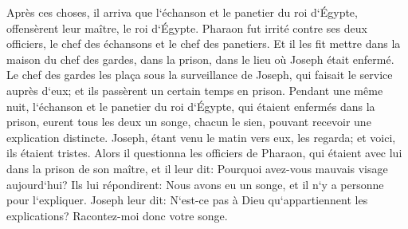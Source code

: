 \verse Après ces choses, il arriva que l`échanson et le panetier du roi d`Égypte, offensèrent leur maître, le roi d`Égypte. 
\verse Pharaon fut irrité contre ses deux officiers, le chef des échansons et le chef des panetiers. 
\verse Et il les fit mettre dans la maison du chef des gardes, dans la prison, dans le lieu où Joseph était enfermé. 
\verse Le chef des gardes les plaça sous la surveillance de Joseph, qui faisait le service auprès d`eux; et ils passèrent un certain temps en prison. 
\verse Pendant une même nuit, l`échanson et le panetier du roi d`Égypte, qui étaient enfermés dans la prison, eurent tous les deux un songe, chacun le sien, pouvant recevoir une explication distincte. 
\verse Joseph, étant venu le matin vers eux, les regarda; et voici, ils étaient tristes. 
\verse Alors il questionna les officiers de Pharaon, qui étaient avec lui dans la prison de son maître, et il leur dit: Pourquoi avez-vous mauvais visage aujourd`hui? 
\verse Ils lui répondirent: Nous avons eu un songe, et il n`y a personne pour l`expliquer. Joseph leur dit: N`est-ce pas à Dieu qu`appartiennent les explications? Racontez-moi donc votre songe. 
